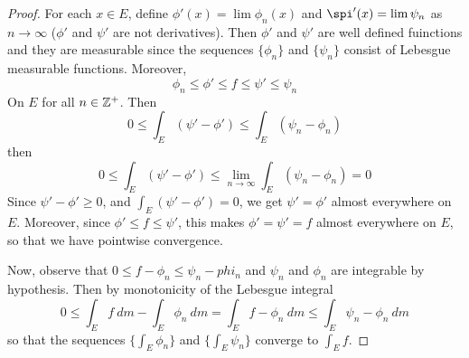 \begin{proof}
    For each $x \in E$, define  $\phi'(x)=\lim{\phi_n(x)}$ and
    $\spi'(x)=\lim{\psi_n}$ as $n \xrightarrow{} \infty$ ($\phi'$ and $\psi'$
    are not derivatives). Then $\phi'$ and  $\psi'$ are well defined fuinctions
    and they are measurable since the sequences $\{\phi_n\}$ and $\{\psi_n\}$
    consist of Lebesgue measurable functions. Moreover,
    \begin{equation*}
        \phi_n \leq \phi' \leq f \leq \psi' \leq \psi_n
    \end{equation*}
    On $E$ for all  $n \in \mathbb{Z}^+$. Then
    \begin{equation*}
        0 \leq  \int_E{(\psi'-\phi')} \leq \int_E{(\psi_n-\phi_n)}
    \end{equation*}
    then
    \begin{equation*}
        0 \leq  \int_E{(\psi'-\phi')} \leq
        \lim_{n \xrightarrow{} \infty}{\int_E{(\psi_n-\phi_n)}}=0
    \end{equation*}
    Since $\psi'-\phi' \geq 0$, and  $\int_E{(\psi'-\phi')}=0$, we get
    $\psi'=\phi'$ almost everywhere on  $E$. Moreover, since  $\phi' \leq f \leq
    \psi'$, this makes  $\phi'=\psi'=f$ almost everywhere on  $E$, so that we
    have pointwise convergence.

    Now, observe that $0 \leq f-\phi_n \leq \psi_n-phi_n$ and $\psi_n$ and
    $\phi_n$ are integrable by hypothesis. Then by monotonicity of the Lebesgue
    integral
    \begin{equation*}
        0 \leq \int_E{f \ dm}-\int_E{\phi_n \ dm}=\int_E{f-\phi_n \ dm} \leq
        \int_E{\psi_n-\phi_n \ dm}
    \end{equation*}
    so that the sequences $\{\int_E{\phi_n}\}$ and $\{\int_E{\psi_n}\}$ converge
    to $\int_E{f}$.
\end{proof}

